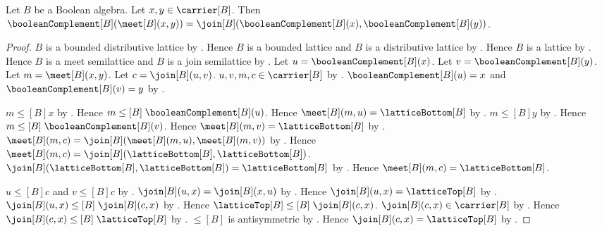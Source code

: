 \begin{theorem}\label{boolean_complement_meet}
    Let $B$ be a Boolean algebra.
    Let $x,y\in\carrier[B]$.
    Then $\booleanComplement[B](\meet[B](x,y))
        =\join[B]
            (\booleanComplement[B](x),\booleanComplement[B](y))$.
\end{theorem}
\begin{proof}
    $B$ is a bounded distributive lattice by
        .
    Hence $B$ is a bounded lattice and $B$ is a distributive lattice by
        .
    Hence $B$ is a lattice by .
    Hence $B$ is a meet semilattice and $B$ is a join semilattice by
        .
    Let $u=\booleanComplement[B](x)$.
    Let $v=\booleanComplement[B](y)$.
    Let $m=\meet[B](x,y)$.
    Let $c=\join[B](u,v)$.
    $u,v,m,c\in\carrier[B]$ by
        .
    $\booleanComplement[B](u)=x$ and
        $\booleanComplement[B](v)=y$ by
        .

    $m\mathrel{\leq[B]}x$ by .
    Hence $m\mathrel{\leq[B]}\booleanComplement[B](u)$.
    Hence $\meet[B](m,u)=\latticeBottom[B]$ by
        .
    $m\mathrel{\leq[B]}y$ by .
    Hence $m\mathrel{\leq[B]}\booleanComplement[B](v)$.
    Hence $\meet[B](m,v)=\latticeBottom[B]$ by
        .
    $\meet[B](m,c)=\join[B](\meet[B](m,u),\meet[B](m,v))$ by
        .
    Hence $\meet[B](m,c)=\join[B]
        (\latticeBottom[B],\latticeBottom[B])$.
    $\join[B](\latticeBottom[B],\latticeBottom[B])
        =\latticeBottom[B]$ by .
    Hence $\meet[B](m,c)=\latticeBottom[B]$.

    $u\mathrel{\leq[B]}c$ and $v\mathrel{\leq[B]}c$ by
        .
    $\join[B](u,x)=\join[B](x,u)$ by .
    Hence $\join[B](u,x)=\latticeTop[B]$ by
        .
    $\join[B](u,x)\mathrel{\leq[B]}\join[B](c,x)$ by
        .
    Hence $\latticeTop[B]\mathrel{\leq[B]}\join[B](c,x)$.
    $\join[B](c,x)\in\carrier[B]$ by .
    Hence $\join[B](c,x)\mathrel{\leq[B]}\latticeTop[B]$ by
        .
    $\leq[B]$ is antisymmetric by
        .
    Hence $\join[B](c,x)=\latticeTop[B]$ by .


\end{proof}
